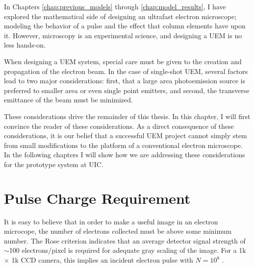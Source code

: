 
In Chapters \ref{chap:previous_models} through \ref{chap:model_results}, I have explored the mathematical side of designing an ultrafast electron microscope; modeling the behavior of a pulse and the effect that column elements have upon it.
However, microscopy is an experimental science, and designing a UEM is no less hands-on.

When designing a UEM system, special care must be given to the creation and propagation of the electron beam.
In the case of single-shot UEM, several factors lead to two major considerations: first, that a large area photoemission source is preferred to smaller area or even single point emitters, and second, the transverse emittance of the beam must be minimized.

These considerations drive the remainder of this thesis.
In this chapter, I will first convince the reader of these considerations.
As a direct consequence of these considerations, it is our belief that a successful UEM project cannot simply stem from small modifications to the platform of a conventional electron microscope.
In the following chapters I will show how we are addressing these considerations for the prototype system at UIC.



\section{Pulse Charge Requirement}

It is easy to believe that in order to make a useful image in an electron microcope, the number of electrons collected must be above some minimum number.
The Rose criterion \cite{rose_television_1948} indicates that an average detector signal strength of $\sim$100 electrons/pixel is required for adequate gray scaling of the image.
For a 1k $\times$ 1k CCD camera, this implies an incident electron pulse with $N=10^8$ \cite{armstrong_prospects_2007}.

